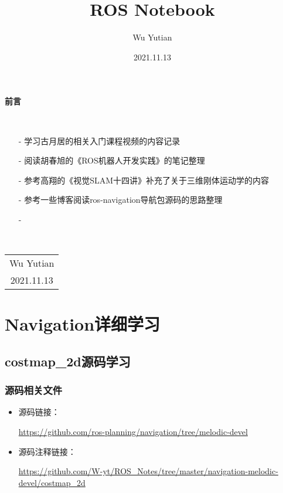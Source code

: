 \documentclass[9pt, oneside]{book}
\title{\Huge{\textbf{ROS Notebook}}}
\author{Wu Yutian}
\date{2021.11.13}
\begin{document}
\maketitle

\setcounter{page}{1}

\begin{center}
    \Huge\textbf{前言}
\end{center}~\

\normalsize
\begin{itemize}
    \item [-] 学习古月居的相关入门课程视频的内容记录
    \item [-] 阅读胡春旭的《ROS机器人开发实践》的笔记整理
    \item [-] 参考高翔的《视觉SLAM十四讲》补充了关于三维刚体运动学的内容
    \item [-] 参考一些博客阅读ros-navigation导航包源码的思路整理
    \item [-]
\end{itemize}

~\\
\begin{flushright}     
    \begin{tabular}{c}
        Wu Yutian\\
        2021.11.13
    \end{tabular}
\end{flushright}

\newpage
{}
\setcounter{page}{1}
\tableofcontents
\newpage
\setcounter{page}{1}



\chapter{Navigation详细学习}

\section{costmap\_2d源码学习}

\subsection{源码相关文件}

\begin{itemize}
    \item 源码链接：
    
    \url{https://github.com/ros-planning/navigation/tree/melodic-devel}

    \item 源码注释链接：
    
    \small
    \url{https://github.com/W-yt/ROS_Notes/tree/master/navigation-melodic-devel/costmap_2d}
    \normalsize
\end{itemize}
\end{document}
